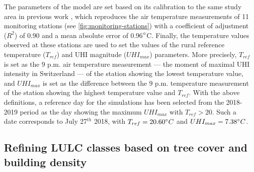 \documentclass[10pt,letterpaper]{article}
\begin{document}

The parameters of the model are set based on its calibration to the same study area in previous work \cite{bosch2020spatially}, which reproduces the air temperature measurements of 11 monitoring stations (see \autoref{fig:monitoring-stations}) with a coefficient of adjustment ($R^2$) of 0.90 and a mean absolute error of 0.96$\degree$C.
Finally, the temperature values observed at these stations are used to set the values of the rural reference temperature ($T_{ref}$) and UHI magnitude ($UHI_{max}$) parameters. More precisely, $T_{ref}$ is set as the 9 p.m. air temperature measurement --- the moment of maximal UHI intensity in Switzerland \cite{burgst2019representing} --- of the station showing the lowest temperature value, and $UHI_{max}$ is set as the difference between the 9 p.m. temperature measurement of the station showing the highest temperature value and $T_{ref}$.
With the above definitions, a reference day for the simulations has been selected from the 2018-2019 period as the day showing the maximum $UHI_{max}$ with $T_{ref} > 20$. Such a date corresponds to July 27$^{th}$ 2018, with $T_{ref} = 20.60 \degree C$ and $UHI_{max} = 7.38 \degree C$.


\subsection*{Refining LULC classes based on tree cover and building density}
\label{sec:refin-lulc-class}
\end{document}
